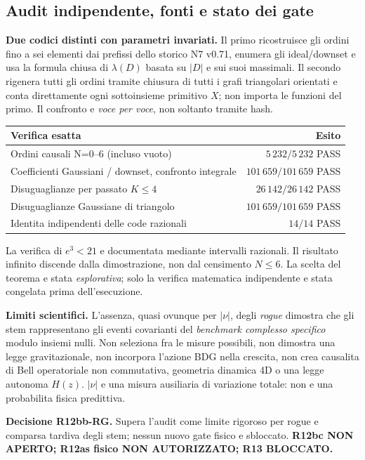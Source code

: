 \documentclass[11pt,a4paper]{article}
\begin{document}
\clearpage
\subsection*{Audit indipendente, fonti e stato dei gate}
\textbf{Due codici distinti con parametri invariati.} Il primo ricostruisce gli ordini fino a sei elementi dai prefissi dello storico N7 v0.71, enumera gli ideal/downset e usa la formula chiusa di $\lambda(D)$ basata su $|D|$ e sui suoi massimali. Il secondo rigenera tutti gli ordini tramite chiusura di tutti i grafi triangolari orientati e conta direttamente ogni sottoinsieme primitivo $X$; non importa le funzioni del primo. Il confronto e \emph{voce per voce}, non soltanto tramite hash.
\begin{center}\small
\begin{tabular}{lr}
\toprule
Verifica esatta & Esito \\\midrule
Ordini causali N=0--6 (incluso vuoto) & $5\,232/5\,232$ PASS\\
Coefficienti Gaussiani / downset, confronto integrale & $101\,659/101\,659$ PASS\\
Disuguaglianze per passato $K\le4$ & $26\,142/26\,142$ PASS\\
Disuguaglianze Gaussiane di triangolo & $101\,659/101\,659$ PASS\\
Identita indipendenti delle code razionali & $14/14$ PASS\\
\bottomrule
\end{tabular}
\end{center}
La verifica di $e^3<21$ e documentata mediante intervalli razionali. Il risultato infinito discende dalla dimostrazione, non dal censimento $N\le6$. La scelta del teorema e stata \emph{esplorativa}; solo la verifica matematica indipendente e stata congelata prima dell'esecuzione.

\textbf{Limiti scientifici.} L'assenza, quasi ovunque per $|\nu|$, degli \emph{rogue} dimostra che gli stem rappresentano gli eventi covarianti del \emph{benchmark complesso specifico} modulo insiemi nulli. Non seleziona fra le misure possibili, non dimostra una legge gravitazionale, non incorpora l'azione BDG nella crescita, non crea causalita di Bell operatoriale non commutativa, geometria dinamica 4D o una legge autonoma $H(z)$. $|\nu|$ e una misura ausiliaria di variazione totale: non e una probabilita fisica predittiva.

\textbf{Decisione R12bb-RG.} Supera l'audit come limite rigoroso per rogue e comparsa tardiva degli stem; nessun nuovo gate fisico e sbloccato. \textbf{R12bc NON APERTO; R12as fisico NON AUTORIZZATO; R13 BLOCCATO.}
\end{document}
